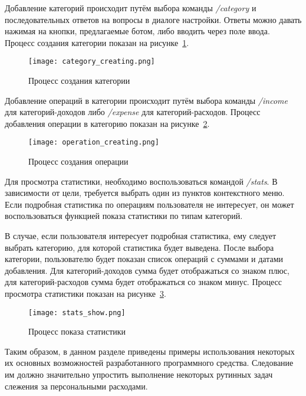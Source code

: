 Добавление категорий происходит путём выбора команды \emph{/category} и последовательных ответов на вопросы в диалоге настройки. Ответы можно давать нажимая на кнопки, предлагаемые ботом, либо вводить через поле ввода. Процесс создания категории показан на рисунке~\ref{fig:manual:category_creating}.

\begin{figure}[ht]
\centering
	\texttt{[image: category\_creating.png]}
	\caption{Процесс создания категории}
	\label{fig:manual:category_creating}
\end{figure}

Добавление операций в категории происходит путём выбора команды \emph{/income} для категорий-доходов либо \emph{/expense} для категорий-расходов. Процесс добавления операции в категорию показан на рисунке~\ref{fig:manual:operation_creating}.

\begin{figure}[ht]
\centering
	\texttt{[image: operation\_creating.png]}
	\caption{Процесс создания операции}
	\label{fig:manual:operation_creating}
\end{figure}

Для просмотра статистики, необходимо воспользоваться командой \emph{/stats}. В зависимости от цели, требуется выбрать один из пунктов контекстного меню. Если подробная статистика по операциям пользователя не интересует, он может воспользоваться функцией показа статистики по типам категорий. 

В случае, если пользователя интересует подробная статистика, ему следует выбрать категорию, для которой статистика будет выведена. После выбора категории, пользователю будет показан список операций с суммами и датами добавления. Для категорий-доходов сумма будет отображаться со знаком плюс, для категорий-расходов сумма будет отображаться со знаком минус. Процесс просмотра статистики показан на рисунке~\ref{fig:manual:stats_show}. 

\begin{figure}[ht]
\centering
	\texttt{[image: stats\_show.png]}
	\caption{Процесс показа статистики}
	\label{fig:manual:stats_show}
\end{figure}

Таким образом, в данном разделе приведены примеры использования некоторых их основных возможностей разработанного программного средства. Следование им должно значительно упростить выполнение некоторых рутинных задач слежения за персональными расходами.
